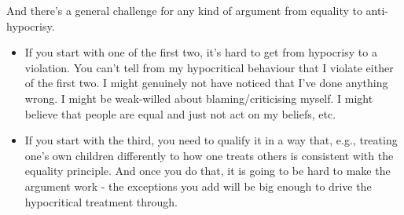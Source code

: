 \documentclass[
]{article}
\providecommand{\tightlist}{%
  \setlength{\itemsep}{0pt}\setlength{\parskip}{0pt}}
\begin{document}
And there's a general challenge for any kind of argument from equality
to anti-hypocrisy.

\begin{itemize}
\tightlist
\item
  If you start with one of the first two, it's hard to get from
  hypocrisy to a violation. You can't tell from my hypocritical
  behaviour that I violate either of the first two. I might genuinely
  not have noticed that I've done anything wrong. I might be weak-willed
  about blaming/criticising myself. I might believe that people are
  equal and just not act on my beliefs, etc.
\item
  If you start with the third, you need to qualify it in a way that,
  e.g., treating one's own children differently to how one treats others
  is consistent with the equality principle. And once you do that, it is
  going to be hard to make the argument work - the exceptions you add
  will be big enough to drive the hypocritical treatment through.
\end{itemize}
\end{document}
